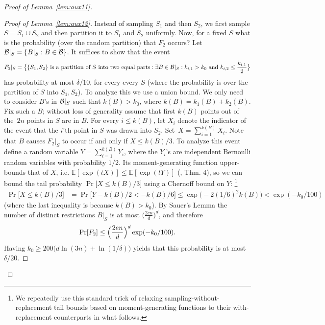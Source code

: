 \documentclass{article}
\newcommand{\B}{{\cal B}}
\newcommand{\evp}[2]{\mathbb{E}_{#2} \left[#1\right]} %
\newcommand{\samp}{S}
\newcommand{\comment}[3]{\marginpar{\textcolor{#2}{#1: #3}}}
\newcommand{\shay}[1]{\comment{Shay}{red}{#1}}
\newcommand{\yoav}[1]{\comment{Yoav}{blue}{#1}}
\newcommand{\akshay}[1]{\comment{Akshay}{magenta}{#1}}
\begin{document}
\begin{proof}[Proof of Lemma~\ref{lem:aux11}]
\begin{proof}[Proof of Lemma~\ref{lem:aux12}]
Instead of sampling $\samp_1$ and then $\samp_2$,
we first sample $\samp=\samp_1\cup \samp_2$ and 
then partition it to $\samp_1$ and $\samp_2$ uniformly.
Now, for a fixed $\samp$ what is the probability (over the random partition)
that $F_2$ occurs?
Let $\B|_{\samp} = \{B|_{\samp} : B\in\B\}$.
It suffices to show that the event
\[F_2|_{\samp} = 
\bigl\{ \{S_1,S_2\}\text{ is a partition of $S$ into two equal parts} :
\exists {B\in\B|_{\samp}}:
  k_{i,1}>k_0 \mbox{ and } k_{i,2} \leq \frac{k_{i,1}}{2}
  \bigr\}
\]
has probability at most $\delta/10$, for every every $\samp$ 
(where the probability is over the partition of $\samp$ into $\samp_1,\samp_2$).
To analyze this we use a union bound. 
We only need to consider $B$'s in $\B|_{\samp}$ such that $k(B) > k_0$,
where $k(B) = k_{1}(B)+ k_{2}(B)$.
Fix such a $B$;
without loss of generality assume that
first $k(B)$ points out of the~$2n$
points in $S$ are in $B$. 
For every $i\leq k(B)$,
let $X_i$ denote the indicator of the event
that the $i$'th point in $S$ was drawn into $S_2$.
Set~$X=\sum_{i=1}^{k(B)}X_i$.
Note that $B$ causes $F_2|_{\samp}$ to occur if and only if $X\leq k(B)/3$.
To analyze this event define a random variable $Y=\sum_{i=1}^{k(B)}Y_i$,
where the $Y_i$'s are independent Bernoulli random variables with probability $1/2$. 
Its moment-generating function upper-bounds that of $X$, i.e. $\evp{\exp(tX)}{} \leq \evp{\exp(tY)}{}$ 
(\cite{H63}, Thm. 4), 
so we can bound the tail probability $\Pr\bigl[X\leq k(B)/3\bigr]$ using a Chernoff bound on $Y$:
\footnote{We repeatedly use this standard trick of relaxing sampling-without-replacement tail bounds based on moment-generating functions to their with-replacement counterparts in what follows.} 
\yoav{Akshay, I can see how this argument works for a single ball $B$,
  but not how it would work for a uniform bound over a set of balls.}
\akshay{Yoav, where is the issue? I believe the proof from the line ``Fix such a $B$" (before this comment inline) to ``By Sauer's Lemma" is for a fixed $B$, then the standard uniform bound applies over the Sauer class $B\mid_S$. And similarly for the other applications of Chernoff to without-replacement in this writeup.}
\shay{Here we should refer to the statement that sampling without repetitions is more concentrated.}
\yoav{This comment by shay appears verbatim in three different
  places. Should all of them be there? (instead of uncommenting
  comments, change the newcommands that create them).}
\begin{align*}
\Pr\bigl[X\leq k(B)/3\bigr]
&=\Pr\bigl[Y- k(B)/2 < -k(B)/6\bigr]\leq
\exp\bigl(-2(1/6)^2k(B)\bigr) < \exp(-k_0/100)
\end{align*}
(where the last inequality is because $k(B) > k_0$).
By Sauer's Lemma
the number of distinct restrictions $B|_S$ is at most $\bigl(\frac{2en}{d}\bigr)^d$, and therefore 
\[\Pr[F_2]\leq \Bigl(\frac{2en}{d}\Bigr)^d\exp(-k_0/100).\]
Having $k_0\geq 200\bigl(d\ln(3n) + \ln(1/\delta) \bigr)$ yields
that this probability is at most $\delta/20$.
\end{proof}


\end{proof}
\end{document}

